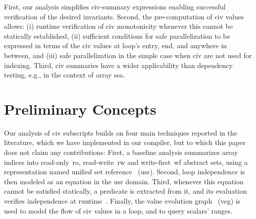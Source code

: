 \documentclass{sig-alternate}
\begin{document}
First, our analysis simplifies {\sc civ}-summary expressions
enabling successful verification of the desired invariants.
Second, the pre-computation of {\sc civ} values allows:
  (i) runtime verification of {\sc civ} monotonicity whenever 
          this cannot be statically established, 
 (ii) sufficient conditions for safe parallelization to 
          be expressed in terms of the {\sc civ} values at loop's 
          entry, end, and anywhere in between, and 
(iii) safe parallelization in the simple case when
        {\sc civ} are not used for indexing.
Third, {\sc civ} summaries have a wider applicability than 
dependency testing, e.g., in the context of array {\sc ssa}.






\section{Preliminary Concepts}
\label{subsec:Background}


Our analysis of {\sc civ} subscripts builds on four main techniques 
reported in the literature, which we have implemented 
in our compiler, but to which this paper does not claim any contributions:
%
First, a baseline analysis summarizes array indices into read-only~{\sc ro}, 
read-write~{\sc rw} and write-first~{\sc wf} abstract sets, using a 
representation named unified set reference~\cite{HybAn} ({\sc usr}).
%
Second, loop independence is then modeled as an equation in the 
{\sc usr} domain. 
%
Third, whenever this equation cannot be satisfied statically, a 
predicate is extracted from it, and its evaluation verifies independence 
at runtime~\cite{CosPLDI}. 
%
Finally, the value evolution graph~\cite{VEG} ({\sc veg}) is 
used to model the flow of {\sc civ} values in a loop, and to 
query scalars' ranges.
\end{document}
